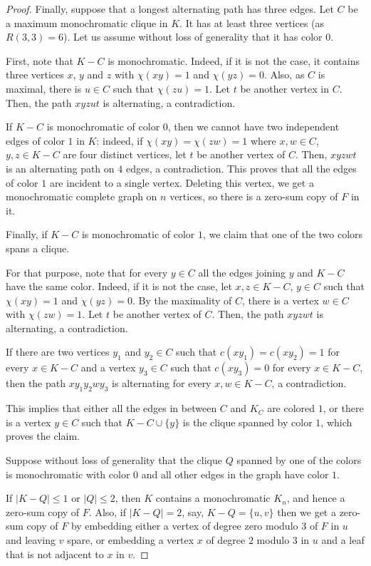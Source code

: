 \documentclass[10pt,a4paper]{amsart}
\begin{document}
\begin{proof}
    Finally, suppose that a longest alternating path has three edges. Let $C$ be a maximum monochromatic clique in $K$. It has at least three vertices (as $R(3,3)=6$). Let us assume without loss of generality that it has color $0$. 

    First, note that $K-C$ is monochromatic. Indeed, if it is not the case, it contains three vertices $x$, $y$ and $z$ with $\chi(xy)=1$ and $\chi(yz)=0$. Also, as $C$ is maximal, there is $u \in C$ such that $\chi(zu)=1$. Let $t$ be another vertex in $C$. Then, the path $xyzut$ is alternating, a contradiction.

    If $K-C$ is monochromatic of color $0$, then we cannot have two independent edges of color $1$ in $K$: indeed, if $\chi(xy)=\chi(zw)=1$ where $x, w \in C$, $y, z \in K-C$ are four distinct vertices, let $t$ be another vertex of $C$. Then, $xyzwt$ is an alternating path on $4$ edges, a contradiction. This proves that all the edges of color $1$ are incident to a single vertex. Deleting this vertex, we get a monochromatic complete graph on $n$ vertices, so there is a zero-sum copy of $F$ in it.

    Finally, if $K-C$ is monochromatic of color $1$, we claim that one of the two colors spans a clique.
    
    
    For that purpose, note that for every $y \in C$ all the edges joining $y$ and $K-C$ have the same color. Indeed, if it is not the case, let $x, z \in K-C$, $y \in C$ such that $\chi(xy)=1$ and $\chi(yz)=0$. By the maximality of $C$, there is a vertex $w \in C$ with $\chi(zw)=1$. Let $t$ be another vertex of $C$. Then, the path $xyzwt$ is alternating, a contradiction.

    If there are two vertices $y_1$ and $y_2 \in C$ such that $c(xy_1)=c(xy_2)=1$ for every $x \in K-C$ and a vertex $y_3 \in C$ such that $c(xy_3)=0$ for every $x \in K-C$, then the path $xy_1y_2wy_3$ is alternating for every $x, w \in K-C$, a contradiction.

    This implies that either all the edges in between $C$ and $K_C$ are colored $1$, or there is a vertex $y \in C$ such that $K-C\cup \{y \}$ is the clique spanned by color $1$, which proves the claim.

    Suppose without loss of generality that the clique $Q$ spanned by one of the colors is monochromatic with color $0$ and all other edges in the graph have color $1$.

    If  $|K-Q| \leq 1$ or $|Q| \leq 2$, then $K$ contains a monochromatic $K_n$, and hence a zero-sum copy of $F$. Also, if $|K-Q|=2$, say, $K-Q = \{u,v\}$ then we get a zero-sum copy of $F$ by embedding either a vertex of degree zero modulo $3$ of $F$ in $u$ and leaving $v$ spare, or embedding a vertex $x$ of degree $2$ modulo $3$ in $u$ and a leaf that is not adjacent to $x$ in $v$.


\end{proof}
\end{document}
